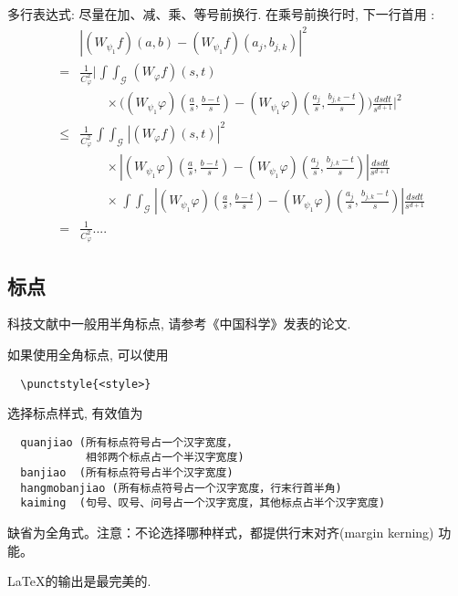 多行表达式: 尽量在加、减、乘、等号前换行. 在乘号前换行时,
下一行首用 \string\times:
\def\iint{\mathop{\int\!\!\!\int}}\def\calG{\mathcal G}
\begin{eqnarray}
&&\left|(W_{\psi_1}f)(a,b)-(W_{\psi_1}f)(a_j,b_{j,k})\right|^{2}\nonumber\\
&=&\frac{1}{C^{2}_{\varphi}}\Bigg|\iint_{\calG} (W_{\varphi}f)(s,t) \nonumber\\
&&\qquad\times \Bigg( (W_{\psi_1}\varphi)\left(\frac{a}{s},
\frac{b-t}{s}\right)
     -(W_{\psi_1}\varphi)\left(\frac{a_{j}}{s}, \frac{b_{j,k}-t}{s}\right)\Bigg)
  \frac{dsdt}{s^{d+1}}\Bigg|^2 \nonumber\\
&\le& \frac{1}{C^2_{\varphi}} \iint_{\calG} |(W_{\varphi}f)(s,t)|^2 \nonumber\\
&&\qquad \times\left| (W_{\psi_1}\varphi)\left(\frac{a}{s},
\frac{b-t}{s}\right)
    -(W_{\psi_1}\varphi)\left(\frac{a_{j}}{s}, \frac{b_{j,k}-t}{s}\right)\right|
   \frac{dsdt}{s^{d+1}}  \nonumber\\
&&\qquad \times   \iint_{\calG}\!
 \left|(W_{\psi_1}\varphi)\left(\frac{a}{s}, \frac{b-t}{s}\right)
    -(W_{\psi_1}\varphi)\left(\frac{a_{j}}{s}, \frac{b_{j,k}-t}{s}\right)\right|
 \frac{ ds dt}{s^{d+1}} \nonumber\\
&=& \frac{1}{C^2_{\varphi}} ....  \label{eq:a0}
\end{eqnarray}


\subsection{标点}
科技文献中一般用半角标点, 请参考《中国科学》发表的论文.

如果使用全角标点, 可以使用
\begin{verbatim}
  \punctstyle{<style>}
\end{verbatim}
选择标点样式, 有效值为
\begin{verbatim}
  quanjiao (所有标点符号占一个汉字宽度，
            相邻两个标点占一个半汉字宽度)
  banjiao  (所有标点符号占半个汉字宽度)
  hangmobanjiao (所有标点符号占一个汉字宽度，行末行首半角)
  kaiming  (句号、叹号、问号占一个汉字宽度，其他标点占半个汉字宽度)
\end{verbatim}
缺省为全角式。注意：不论选择哪种样式，都提供行末对齐(margin kerning) 功能。



\begin{Theorem} \label{thm:latex}
\LaTeX 的输出是最完美的.
\end{Theorem}

